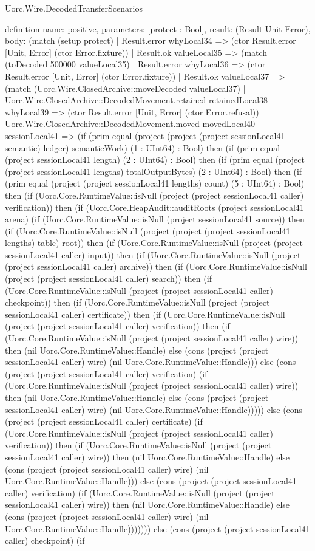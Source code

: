 \begin{lexlean}{Uorc.Wire.DecodedTransferScenarios}
\begin{semanticmodule}
definition{
  name: positive,
  parameters: [protect : Bool],
  result: (Result Unit Error),
  body: (match (setup protect)
    | Result.error whyLocal34 => (ctor Result.error [Unit, Error] (ctor Error.fixture))
    | Result.ok valueLocal35 => (match (toDecoded 500000 valueLocal35)
      | Result.error whyLocal36 => (ctor Result.error [Unit, Error] (ctor Error.fixture))
      | Result.ok valueLocal37 => (match (Uorc.Wire.ClosedArchive::moveDecoded valueLocal37)
        | Uorc.Wire.ClosedArchive::DecodedMovement.retained retainedLocal38 whyLocal39 => (ctor Result.error [Unit, Error] (ctor Error.refusal))
        | Uorc.Wire.ClosedArchive::DecodedMovement.moved movedLocal40 sessionLocal41 => (if (prim equal (project (project (project sessionLocal41 semantic) ledger) semanticWork) (1 : UInt64) : Bool) then (if (prim equal (project sessionLocal41 length) (2 : UInt64) : Bool) then (if (prim equal (project (project sessionLocal41 lengths) totalOutputBytes) (2 : UInt64) : Bool) then (if (prim equal (project (project sessionLocal41 lengths) count) (5 : UInt64) : Bool) then (if (Uorc.Core.RuntimeValue::isNull (project (project sessionLocal41 caller) verification)) then (if (Uorc.Core.HeapAudit::auditRoots (project sessionLocal41 arena) (if (Uorc.Core.RuntimeValue::isNull (project sessionLocal41 source)) then (if (Uorc.Core.RuntimeValue::isNull (project (project (project sessionLocal41 lengths) table) root)) then (if (Uorc.Core.RuntimeValue::isNull (project (project sessionLocal41 caller) input)) then (if (Uorc.Core.RuntimeValue::isNull (project (project sessionLocal41 caller) archive)) then (if (Uorc.Core.RuntimeValue::isNull (project (project sessionLocal41 caller) search)) then (if (Uorc.Core.RuntimeValue::isNull (project (project sessionLocal41 caller) checkpoint)) then (if (Uorc.Core.RuntimeValue::isNull (project (project sessionLocal41 caller) certificate)) then (if (Uorc.Core.RuntimeValue::isNull (project (project sessionLocal41 caller) verification)) then (if (Uorc.Core.RuntimeValue::isNull (project (project sessionLocal41 caller) wire)) then (nil Uorc.Core.RuntimeValue::Handle) else (cons (project (project sessionLocal41 caller) wire) (nil Uorc.Core.RuntimeValue::Handle))) else (cons (project (project sessionLocal41 caller) verification) (if (Uorc.Core.RuntimeValue::isNull (project (project sessionLocal41 caller) wire)) then (nil Uorc.Core.RuntimeValue::Handle) else (cons (project (project sessionLocal41 caller) wire) (nil Uorc.Core.RuntimeValue::Handle))))) else (cons (project (project sessionLocal41 caller) certificate) (if (Uorc.Core.RuntimeValue::isNull (project (project sessionLocal41 caller) verification)) then (if (Uorc.Core.RuntimeValue::isNull (project (project sessionLocal41 caller) wire)) then (nil Uorc.Core.RuntimeValue::Handle) else (cons (project (project sessionLocal41 caller) wire) (nil Uorc.Core.RuntimeValue::Handle))) else (cons (project (project sessionLocal41 caller) verification) (if (Uorc.Core.RuntimeValue::isNull (project (project sessionLocal41 caller) wire)) then (nil Uorc.Core.RuntimeValue::Handle) else (cons (project (project sessionLocal41 caller) wire) (nil Uorc.Core.RuntimeValue::Handle))))))) else (cons (project (project sessionLocal41 caller) checkpoint) (if }
\end{semanticmodule}
\end{lexlean}
